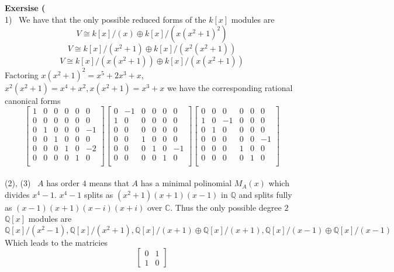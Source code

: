 \documentclass[12pt]{article}
\newenvironment{ques}[1]{\textbf{Exersise #1}\vspace{1 mm}\\ }{\bigskip}
\theoremstyle{definition}
\newcommand{\Q}{\mathbb Q}
\newcommand{\C}{\mathbb C}
\begin{document}
\begin{ques}{7.3}
	(1) \ We have that the only possible reduced forms of the $k[x]$ modules are
	$$V \cong k[x]/(x) \oplus k[x]/(x(x^2+1)^2)$$
	$$V \cong k[x]/(x^2 + 1) \oplus k[x]/(x^2(x^2+1))$$
	$$V \cong k[x]/(x(x^2 + 1)) \oplus k[x]/(x(x^2+1))$$
	Factoring $x(x^2+1)^2 = x^5 + 2x^3 + x$, $x^2(x^2 + 1) = x^4 + x^2, x(x^2 +
	1) = x^3 + x$ we have the corresponding rational canonical forms
	$$\begin{bmatrix} 
	1 & 0 & 0 & 0 & 0 & 0\\ 
	0 & 0 & 0 & 0 & 0 & 0\\ 
	0 & 1 & 0 & 0 & 0 & -1\\ 
	0 & 0 & 1 & 0 & 0 & 0\\ 
	0 & 0 & 0 & 1 & 0 & -2\\ 
	0 & 0 & 0 & 0 & 1 & 0\\ 
	\end{bmatrix}
	\begin{bmatrix} 
	0 & -1 & 0 & 0 & 0 & 0\\ 
	1 & 0 & 0 & 0 & 0 & 0\\ 
	0 & 0 & 0 & 0 & 0 & 0\\ 
	0 & 0 & 1 & 0 & 0 & 0\\ 
	0 & 0 & 0 & 1 & 0 & -1\\ 
	0 & 0 & 0 & 0 & 1 & 0\\ 
	\end{bmatrix}
	\begin{bmatrix} 
	0 & 0 & 0 & 0 & 0 & 0\\ 
	1 & 0 & -1 & 0 & 0 & 0\\ 
	0 & 1 & 0 & 0 & 0 & 0\\ 
	0 & 0 & 0 & 0 & 0 & -1\\ 
	0 & 0 & 0 & 1 & 0 & 0\\ 
	0 & 0 & 0 & 0 & 1 & 0\\ 
	\end{bmatrix}$$
	\\
	(2), (3) \ $A$ has order $4$  means that $A$ has a minimal polinomial
	$M_A(x)$ which divides $x^4 - 1$. $x^4 - 1$ splits as $(x^2 + 1)(x+1)(x-1)$
	in $\Q$ and splits fully as $(x - 1)(x + 1)(x - i)(x + i)$ over $\C$. Thus
	the only possible degree $2$ $\Q[x]$ modules are
	$$\Q[x]/(x^2 - 1), \Q[x]/(x^2 + 1), \Q[x]/(x + 1)\oplus \Q[x]/(x + 1), \Q[x]/(x
	- 1)\oplus \Q[x]/(x - 1)$$
	Which leads to the matricies
	$$\begin{bmatrix} 
	0 & 1 \\ 
	1 & 0
	\end{bmatrix}
$$
\end{ques}
\end{document}
